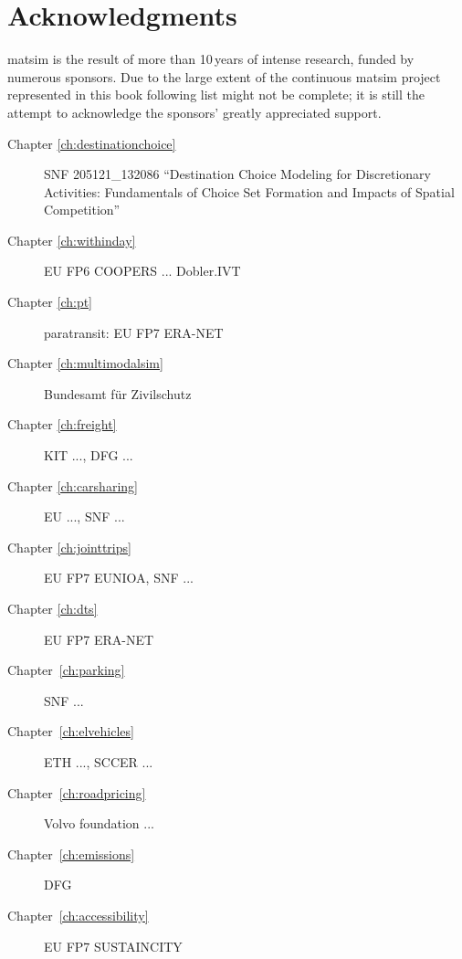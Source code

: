 \chapter*{Acknowledgments}
\gls{matsim} is the result of more than 10\,years of intense research, funded by numerous sponsors. Due to the large extent of the continuous \gls{matsim} project represented in this book following list might not be complete; it is still the attempt to acknowledge the sponsors' greatly appreciated support. 

\begin{description}
\item[Chapter \ref{ch:destinationchoice}] SNF 205121\_132086 ``Destination Choice Modeling for Discretionary Activities: Fundamentals of Choice Set Formation and Impacts of Spatial Competition''  

\item[Chapter \ref{ch:withinday}] EU FP6 COOPERS ... Dobler.IVT

\item[Chapter \ref{ch:pt}] paratransit: EU FP7 ERA-NET 

\item[Chapter \ref{ch:multimodalsim}] Bundesamt für Zivilschutz 

\item[Chapter \ref{ch:freight}] KIT ..., DFG ... 

\item[Chapter \ref{ch:carsharing}] EU ..., SNF ... 

\item[Chapter \ref{ch:jointtrips}] EU FP7 EUNIOA, SNF ... 

\item[Chapter \ref{ch:dts}]  EU FP7 ERA-NET

\item[Chapter~\ref{ch:parking}]  SNF ... 

\item[Chapter~\ref{ch:elvehicles}]  ETH ..., SCCER ... 

\item[Chapter~\ref{ch:roadpricing}]  Volvo foundation ...

\item[Chapter~\ref{ch:emissions}]  DFG 

\item[Chapter~\ref{ch:accessibility}]  EU FP7 SUSTAINCITY


\end{description}

